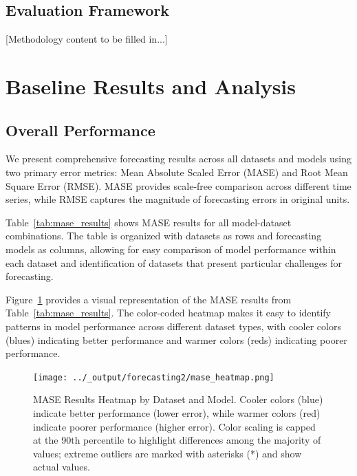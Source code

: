 \documentclass{article}
\begin{document}
\subsection{Evaluation Framework}

[Methodology content to be filled in...]

\section{Baseline Results and Analysis}
\label{sec:results}


\subsection{Overall Performance}

We present comprehensive forecasting results across all datasets and models using two primary error metrics: Mean Absolute Scaled Error (MASE) and Root Mean Square Error (RMSE). MASE provides scale-free comparison across different time series, while RMSE captures the magnitude of forecasting errors in original units.

Table~\ref{tab:mase_results} shows MASE results for all model-dataset combinations. The table is organized with datasets as rows and forecasting models as columns, allowing for easy comparison of model performance within each dataset and identification of datasets that present particular challenges for forecasting.



Figure~\ref{fig:mase_heatmap} provides a visual representation of the MASE results from Table~\ref{tab:mase_results}. The color-coded heatmap makes it easy to identify patterns in model performance across different dataset types, with cooler colors (blues) indicating better performance and warmer colors (reds) indicating poorer performance.

\begin{figure}[htbp]
\centering
\texttt{[image: ../\_output/forecasting2/mase\_heatmap.png]}
\caption{MASE Results Heatmap by Dataset and Model. Cooler colors (blue) indicate better performance (lower error), while warmer colors (red) indicate poorer performance (higher error). Color scaling is capped at the 90th percentile to highlight differences among the majority of values; extreme outliers are marked with asterisks (*) and show actual values.}
\label{fig:mase_heatmap}
\end{figure}
\end{document}
